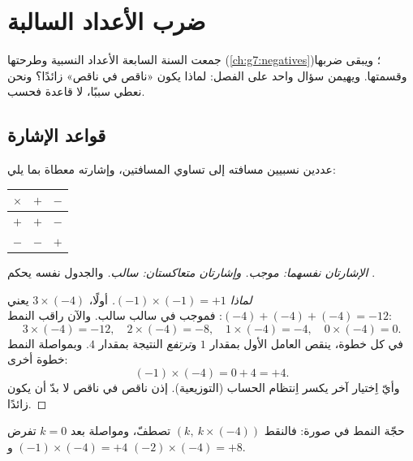 \chapter{ضرب الأعداد السالبة}\label{ch:g8:negprod}

جمعت السنة السابعة الأعداد النسبية وطرحتها
(\cref{ch:g7:negatives})؛ ويبقى ضربها وقسمتها. ويهيمن
سؤال واحد على الفصل: لماذا يكون «ناقص في ناقص»
زائدًا؟ ونحن نعطي سببًا، لا قاعدة فحسب.

\section{قواعد الإشارة}

\begin{theorem}\label{thm:g8:negprod:rules}
 عددين نسبيين مسافته إلى  تساوي
 المسافتين، وإشارته معطاة بما يلي:
\begin{center}
\renewcommand{\arraystretch}{1.3}
\begin{tabular}{c|cc}
$\times$ & $+$ & $-$ \\
\hline
$+$ & $+$ & $-$ \\
$-$ & $-$ & $+$ \\
\end{tabular}
\end{center}
\emph{الإشارتان نفسهما:  موجب. وإشارتان متعاكستان:  سالب.}
والجدول نفسه يحكم .
\end{theorem}

\begin{proof}[لماذا $(-1) \times (-1) = +1$]
أولًا، $3 \times (-4)$ يعني $(-4) + (-4) + (-4) = -12$: فموجب
في سالب سالب. والآن راقب النمط:
\[
3 \times (-4) = -12, \quad
2 \times (-4) = -8, \quad
1 \times (-4) = -4, \quad
0 \times (-4) = 0 .
\]
في كل خطوة، ينقص العامل الأول بمقدار $1$ و\emph{ترتفع} النتيجة
بمقدار $4$. وبمواصلة النمط خطوة أخرى:
\[
(-1) \times (-4) = 0 + 4 = +4 .
\]
وأيّ اِختيار آخر يكسر اِنتظام الحساب
(التوزيعية). إذن ناقص في ناقص لا بدّ أن يكون زائدًا.
\end{proof}

\begin{omfigure}

{\small حجّة النمط في صورة: فالنقط
$(k,\ k \times (-4))$ تصطفّ، ومواصلة  بعد $k = 0$
تفرض $(-1)\times(-4) = +4$ و $(-2)\times(-4) = +8$.}
\end{omfigure}

